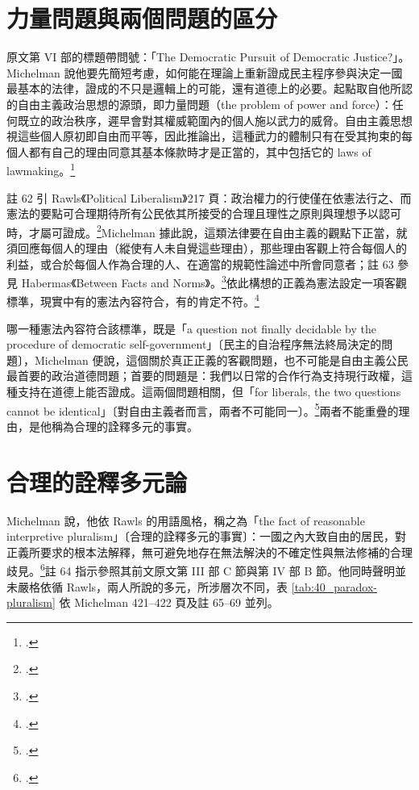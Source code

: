 \section{力量問題與兩個問題的區分}
\label{sec:40_paradox-2}

原文第 VI 部的標題帶問號：「The Democratic Pursuit of Democratic Justice?」。Michelman 說他要先簡短考慮，如何能在理論上重新證成民主程序參與決定一國最基本的法律，證成的不只是邏輯上的可能，還有道德上的必要。起點取自他所認的自由主義政治思想的源頭，即力量問題（the problem of power and force）：任何既立的政治秩序，遲早會對其權威範圍內的個人施以武力的威脅。自由主義思想視這些個人原初即自由而平等，因此推論出，這種武力的體制只有在受其拘束的每個人都有自己的理由同意其基本條款時才是正當的，其中包括它的 laws of lawmaking。\footcite[420]{michelman1998}

註 62 引 Rawls《Political Liberalism》217 頁：政治權力的行使僅在依憲法行之、而憲法的要點可合理期待所有公民依其所接受的合理且理性之原則與理想予以認可時，才屬可證成。\footcite[420 n.62]{michelman1998}Michelman 據此說，這類法律要在自由主義的觀點下正當，就須回應每個人的理由（縱使有人未自覺這些理由），那些理由客觀上符合每個人的利益，或合於每個人作為合理的人、在適當的規範性論述中所會同意者；註 63 參見 Habermas《Between Facts and Norms》。\footcite[420--421 \& n.63]{michelman1998}依此構想的正義為憲法設定一項客觀標準，現實中有的憲法內容符合，有的肯定不符。\footcite[421]{michelman1998}

哪一種憲法內容符合該標準，既是「a question not finally decidable by the procedure of democratic self-government」〔民主的自治程序無法終局決定的問題〕，Michelman 便說，這個關於真正正義的客觀問題，也不可能是自由主義公民最首要的政治道德問題；首要的問題是：我們以日常的合作行為支持現行政權，這種支持在道德上能否證成。這兩個問題相關，但「for liberals, the two questions cannot be identical」〔對自由主義者而言，兩者不可能同一〕。\footcite[421]{michelman1998}兩者不能重疊的理由，是他稱為合理的詮釋多元的事實。

\section{合理的詮釋多元論}
\label{sec:40_paradox-3}

Michelman 說，他依 Rawls 的用語風格，稱之為「the fact of reasonable interpretive pluralism」〔合理的詮釋多元的事實〕：一國之內大致自由的居民，對正義所要求的根本法解釋，無可避免地存在無法解決的不確定性與無法修補的合理歧見。\footcite[421 \& n.64]{michelman1998}註 64 指示參照其前文原文第 III 部 C 節與第 IV 部 B 節。他同時聲明並未嚴格依循 Rawls，兩人所說的多元，所涉層次不同，表 \ref{tab:40_paradox-pluralism} 依 Michelman 421--422 頁及註 65--69 並列。

